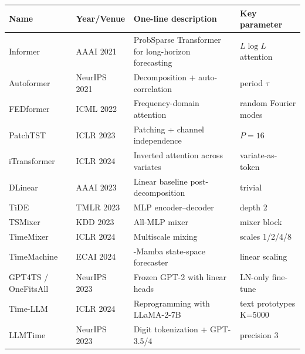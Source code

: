 {\def\LTcaptype{none} %
\begin{longtable}[]{@{}
  >{\raggedright\arraybackslash}p{}
  >{\raggedright\arraybackslash}p{}
  >{\raggedright\arraybackslash}p{}
  >{\raggedright\arraybackslash}p{}@{}}
\toprule\noalign{}
\begin{minipage}[b]{\linewidth}\raggedright
Name
\end{minipage} & \begin{minipage}[b]{\linewidth}\raggedright
Year/Venue
\end{minipage} & \begin{minipage}[b]{\linewidth}\raggedright
One-line description
\end{minipage} & \begin{minipage}[b]{\linewidth}\raggedright
Key parameter
\end{minipage} \\
\midrule\noalign{}
\endhead
\bottomrule\noalign{}
\endlastfoot
Informer & AAAI 2021 & ProbSparse Transformer for long-horizon forecasting & \(L \log L\) attention \\
Autoformer & NeurIPS 2021 & Decomposition + auto-correlation & period \(\tau\) \\
FEDformer & ICML 2022 & Frequency-domain attention & random Fourier modes \\
PatchTST & ICLR 2023 & Patching + channel independence & \(P=16\) \\
iTransformer & ICLR 2024 & Inverted attention across variates & variate-as-token \\
DLinear & AAAI 2023 & Linear baseline post-decomposition & trivial \\
TiDE & TMLR 2023 & MLP encoder--decoder & depth 2 \\
TSMixer & KDD 2023 & All-MLP mixer & mixer block \\
TimeMixer & ICLR 2024 & Multiscale mixing & scales 1/2/4/8 \\
TimeMachine & ECAI 2024 & 4-Mamba state-space forecaster & linear scaling \\
GPT4TS / OneFitsAll & NeurIPS 2023 & Frozen GPT-2 with linear heads & LN-only fine-tune \\
Time-LLM & ICLR 2024 & Reprogramming with LLaMA-2-7B & text prototypes K=5000 \\
LLMTime & NeurIPS 2023 & Digit tokenization + GPT-3.5/4 & precision 3 \\

\end{longtable}}
